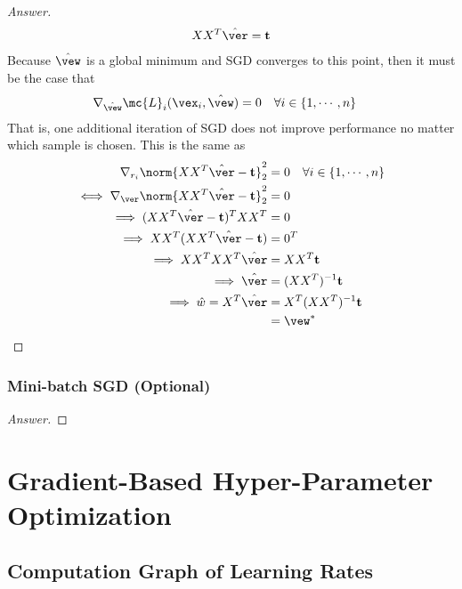 \documentclass{article}
\begin{document}
\begin{proof}[Answer]
		\begin{align}
			XX^T \hat{\ver} = \textbf{t}
		\end{align}
		Because $\hat{\vew}$ is a global minimum and SGD converges to this point, then it must be the case that
		\begin{align}
			\nabla_{\hat{\vew}} \mc{L}_i(\vex_i, \hat{\vew}) &= 0\quad \forall i \in \{1, \cdots, n\}
		\end{align}
		That is, one additional iteration of SGD does not improve performance no matter which sample is chosen. This is the same as
		\begin{align}
			\nabla_{r_i} \norm{X X^T \hat{\ver} - \textbf{t}}_2^2 &= 0\quad \forall i \in \{1, \cdots, n\} \\
			\iff \nabla_{\ver} \norm{X X^T \hat{\ver} - \textbf{t}}_2^2 &= 0 \\
			\implies (X X^T \hat{\ver} - \textbf{t})^T XX^T &= 0 \\
			\implies XX^T (X X^T \hat{\ver} - \textbf{t}) &= 0^T \\
			\implies XX^T XX^T \hat{\ver} &= XX^T \textbf{t} \\
			\implies \hat{\ver} &= (XX^T)^{-1} \textbf{t} \\
			\implies \hat{w} = X^T \hat{\ver} &= X^T (XX^T)^{-1} \textbf{t} \\
			&= \vew^*
		\end{align}
	\end{proof}
	
	\subsubsection{Mini-batch SGD (Optional)}
	\begin{proof}[Answer]
		
	\end{proof}

	\section{Gradient-Based Hyper-Parameter Optimization}
	\subsection{Computation Graph of Learning Rates}
\end{document}
